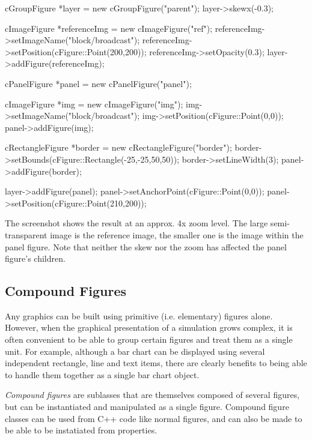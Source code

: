\begin{cpp}
cGroupFigure *layer = new cGroupFigure("parent");
layer->skewx(-0.3);

cImageFigure *referenceImg = new cImageFigure("ref");
referenceImg->setImageName("block/broadcast");
referenceImg->setPosition(cFigure::Point(200,200));
referenceImg->setOpacity(0.3);
layer->addFigure(referenceImg);

cPanelFigure *panel = new cPanelFigure("panel");

cImageFigure *img = new cImageFigure("img");
img->setImageName("block/broadcast");
img->setPosition(cFigure::Point(0,0));
panel->addFigure(img);

cRectangleFigure *border = new cRectangleFigure("border");
border->setBounds(cFigure::Rectangle(-25,-25,50,50));
border->setLineWidth(3);
panel->addFigure(border);

layer->addFigure(panel);
panel->setAnchorPoint(cFigure::Point(0,0));
panel->setPosition(cFigure::Point(210,200));
\end{cpp}


The screenshot shows the result at an approx. 4x zoom level. The large
semi-transparent image is the reference image, the smaller one is the image within the panel
figure. Note that neither the skew nor the zoom has affected the panel figure's children.

\begin{center}

\end{center}


\subsection{Compound Figures}
\label{sec:graphics:compound-figures}

Any graphics can be built using primitive (i.e. elementary) figures
alone. However, when the graphical presentation of a simulation
grows complex, it is often convenient to be able to group certain
figures and treat them as a single unit. For example, although
a bar chart can be displayed using several independent rectangle,
line and text items, there are clearly benefits to being able to
handle them together as a single bar chart object.

\textit{Compound figures} are  sublasses that
are themselves composed of several figures, but can be instantiated
and manipulated as a single figure. Compound figure classes
can be used from C++ code like normal figures, and can also
be made to be able to be instatiated from  properties.

